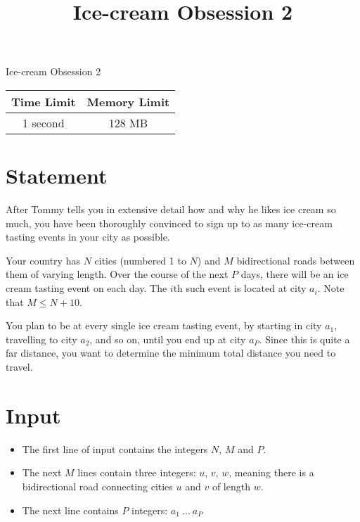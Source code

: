 \documentclass{article}
\begin{document}
\title{\vspace{-5ex}Ice-cream Obsession 2}
\author{\vspace{-5ex}}
\date{\vspace{-5ex}}
\pagestyle{fancy}
\fancyhf{}

\begin{center}
\huge{Ice-cream Obsession 2}\small\\
\vspace{5ex}
\begin{tabular}{|c|c|} 
\hline
Time Limit & Memory Limit \\
\hline
1 second & 128 MB \\

\hline
\end{tabular}
\end{center}
\section*{Statement}

After Tommy tells you in extensive detail how and why he likes ice cream so much, you have been thoroughly convinced to sign up to as many ice-cream tasting events in your city as possible.

Your country has $N$ cities (numbered 1 to $N$) and $M$ bidirectional roads between them of varying length. Over the course of the next $P$ days, there will be an ice cream tasting event on each day. The $i$th such event is located at city $a_i$. Note that $M \le N + 10$.

You plan to be at every single ice cream tasting event, by starting in city $a_1$, travelling to city $a_2$, and so on, until you end up at city $a_P$. Since this is quite a far distance, you want to determine the minimum total distance you need to travel.

\section*{Input}

\begin{itemize}
\item The first line of input contains the integers $N$, $M$ and $P$.
\item The next $M$ lines contain three integers: $u$, $v$, $w$, meaning there is a bidirectional road connecting cities $u$ and $v$ of length $w$.
\item The next line contains $P$ integers: $a_1\ \dots \ a_P$
\end{itemize}
\end{document}
